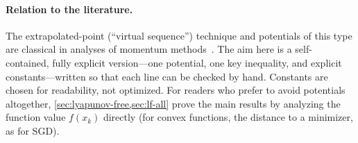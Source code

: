 \paragraph{Relation to the literature.} The extrapolated-point (``virtual sequence'')
technique and potentials of this type are classical in analyses of momentum
methods~\cite{ghadimi2015,yang2016,yu2019,liu2020,sebbouh2021}. The aim here is a
self-contained, fully explicit version---one potential, one key inequality, and explicit
constants---written so that each line can be checked by hand. Constants are chosen for
readability, not optimized. For readers who prefer to avoid potentials altogether,
\cref{sec:lyapunov-free,sec:lf-all} prove the main results by analyzing the function value
$f(x_k)$ directly (for convex functions, the distance to a minimizer, as for SGD).
